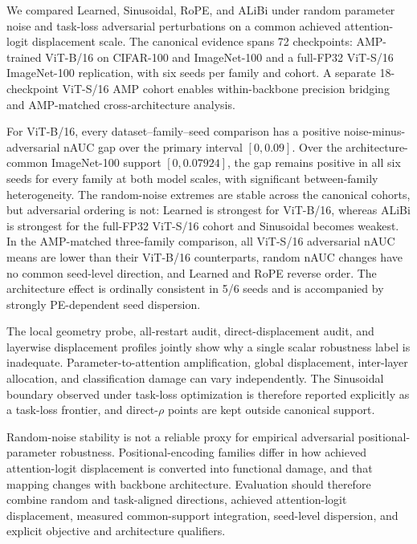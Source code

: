 \documentclass[preprint,12pt,authoryear]{elsarticle}
\begin{document}
We compared Learned, Sinusoidal, RoPE, and ALiBi under random parameter
noise and task-loss adversarial perturbations on a common achieved
attention-logit displacement scale. The canonical evidence spans 72
checkpoints: AMP-trained ViT-B/16 on CIFAR-100 and ImageNet-100 and a
full-FP32 ViT-S/16 ImageNet-100 replication, with six seeds per family and
cohort. A separate 18-checkpoint ViT-S/16 AMP cohort enables within-backbone
precision bridging and AMP-matched cross-architecture analysis.

For ViT-B/16, every dataset--family--seed comparison has a positive
noise-minus-adversarial nAUC gap over the primary interval
$[0,0.09]$. Over the architecture-common ImageNet-100 support
$[0,0.07924]$, the gap remains positive in all six seeds for every family
at both model scales, with significant between-family heterogeneity. The
random-noise extremes are stable across the canonical cohorts, but
adversarial ordering is not: Learned is strongest for ViT-B/16, whereas
ALiBi is strongest for the full-FP32 ViT-S/16 cohort and Sinusoidal becomes
weakest. In the AMP-matched three-family comparison, all ViT-S/16
adversarial nAUC means are lower than their ViT-B/16 counterparts, random
nAUC changes have no common seed-level direction, and Learned and RoPE
reverse order. The architecture effect is ordinally consistent in 5/6
seeds and is accompanied by strongly PE-dependent seed dispersion.

The local geometry probe, all-restart audit, direct-displacement audit, and
layerwise displacement profiles jointly show why a single scalar robustness
label is inadequate. Parameter-to-attention amplification, global displacement,
inter-layer allocation, and classification damage can vary independently.
The Sinusoidal boundary observed under task-loss optimization is therefore
reported explicitly as a task-loss frontier, and direct-$\rho$
points are kept outside canonical support.

Random-noise stability is not a reliable proxy for empirical adversarial
positional-parameter robustness. Positional-encoding families differ in
how achieved attention-logit displacement is converted into functional
damage, and that mapping changes with backbone architecture. Evaluation
should therefore combine random and task-aligned directions, achieved
attention-logit displacement, measured common-support integration, seed-level
dispersion, and explicit objective and architecture qualifiers.

\end{document}
